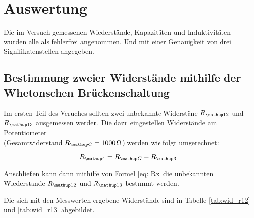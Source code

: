 \newpage
\section{Auswertung}

Die im Versuch gemessenen Wiederstände, Kapazitäten und Induktivitäten
wurden alle als fehlerfrei angenommen.
Und mit einer Genauigkeit von drei Signifikatenstellen angegeben.%

\subsection{Bestimmung zweier Widerstände mithilfe der Whetonschen Brückenschaltung}

Im ersten Teil des Veruches sollten zwei unbekannte Widerstäne $R_{\map{12}}$ und $R_{\map{13}}$ ausgemessen werden.
Die dazu eingestellen Widerstände am Potentiometer \\ (Gesamtwiderstand 
$R_{\map{G}}=\SI{1000}{\ohm}$) werden wie folgt umgerechnet:

\begin{equation*}
R\ua{4}=R\ua{G}-R_{\map{3}}
\end{equation*}

Anschließen kann dann mithilfe von Formel \eqref{eq: Rx} die 
unbekannten Wiederstände $R_{\map{12}}$ und $R_{\map{13}}$ bestimmt werden. 

Die sich mit den Messwerten ergebene Widerstände sind in Tabelle \ref{tab:wid_r12} und
\ref{tab:wid_r13} abgebildet. 

